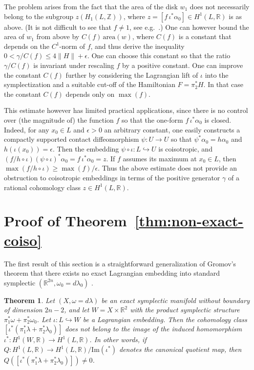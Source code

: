 \documentclass{amsart}
\newtheorem{thm}{Theorem}[section]
\theoremstyle{remark}
\def\area{{\textrm{area}}}
\def\R{{\mathbb R}}
\def\Z{{\mathbb Z}}
\begin{document}
The problem arises from the fact that the area of the disk $w_1$ does not necessarily belong to the subgroup $z (H_1 (L, \Z))$, where $z = [f \, \iota^* \alpha_0] \in H^1 (L, \R)$ is as above.
(It is not difficult to see that $f \not= 1$, see e.g.\ \cite{mueller:csc16}.)
One can however bound the area of $w_1$ from above by $C (f) \, \area (w)$, where $C (f)$ is a constant that depends on the $C^1$-norm of $f$, and thus derive the inequality $0 < \gamma / C (f) \le 4 \| H \| + \epsilon$.
One can choose this constant so that the ratio $\gamma / C (f)$ is invariant under rescaling $f$ by a positive constant.
One can improve the constant $C (f)$ further by considering the Lagrangian lift of $\iota$ into the symplectization and a suitable cut-off of the Hamiltonian $F = \pi_2^* H$.
In that case the constant $C (f)$ depends only on $\max (f)$.

This estimate however has limited practical applications, since there is no control over (the magnitude of) the function $f$ so that the one-form $f \, \iota^* \alpha_0$ is closed.
Indeed, for any $x_0 \in L$ and $\epsilon > 0$ an arbitrary constant, one easily constructs a compactly supported contact diffeomorphism $\psi \colon U \to U$ so that $\psi^* \alpha_0 = h \alpha_0$ and $h (\iota (x_0)) = \epsilon$.
Then the embedding $\psi \circ \iota \colon L \hookrightarrow U$ is coisotropic, and $(f / h \circ \iota) (\psi \circ \iota)^* \alpha_0 = f \, \iota^* \alpha_0 = z$.
If $f$ assumes its maximum at $x_0 \in L$, then $\max (f / h \circ \iota) \ge \max (f) / \epsilon$.
Thus the above estimate does not provide an obstruction to coisotropic embeddings in terms of the positive generator $\gamma$ of a rational cohomology class $z \in H^1 (L, \R)$.

\section{Proof of Theorem~\ref{thm:non-exact-coiso}} \label{sec:proof}

The first result of this section is a straightforward generalization of Gromov's theorem that there exists no exact Lagrangian embedding into standard symplectic $(\R^{2 n}, \omega_0 = d\lambda_0)$ \cite[Corollary~2.3.B$_{\textrm 2}$]{gromov:pcs85}.

\begin{thm}
Let $(X, \omega = d\lambda)$ be an exact symplectic manifold without boundary of dimension $2 n - 2$, and let $W = X \times \R^2$ with the product symplectic structure $\pi_1^* \omega + \pi_2^* \omega_0$.
Let $\iota \colon L \hookrightarrow W$ be a Lagrangian embedding.
Then the cohomology class $[\iota^* (\pi_1^* \lambda + \pi_2^* \lambda_0)]$ does not belong to the image of the induced homomorphism $\iota^* \colon H^1 (W, \R) \to H^1 (L, \R)$.
In other words, if $Q \colon H^1 (L, \R) \to H^1 (L, \R) / \textrm{Im} (\iota^*)$ denotes the canonical quotient map, then $Q ([\iota^* (\pi_1^* \lambda + \pi_2^* \lambda_0)]) \not= 0$.
\end{thm}
\end{document}
